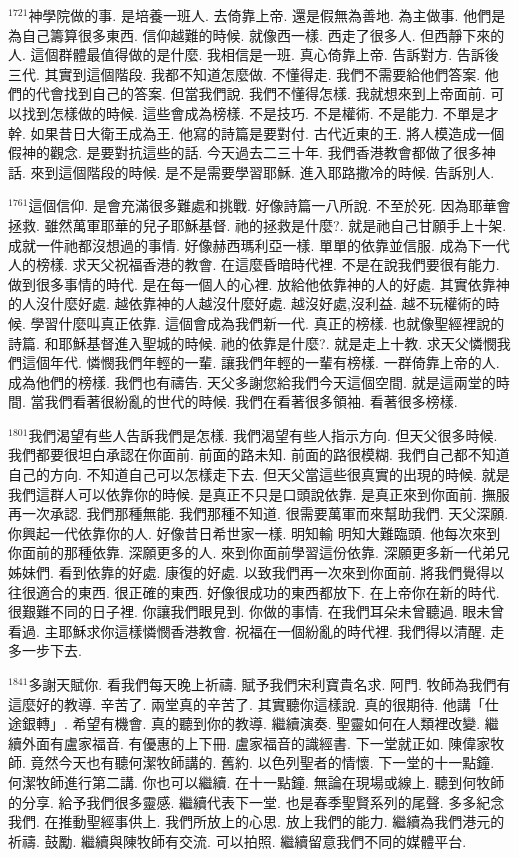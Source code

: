 \documentclass{book}
\begin{document}
$^{1721}$神學院做的事.
是培養一班人.
去倚靠上帝.
還是假無為善地.
為主做事.
他們是為自己籌算很多東西.
信仰越難的時候.
就像西一樣.
西走了很多人.
但西靜下來的人.
這個群體最值得做的是什麼.
我相信是一班.
真心倚靠上帝.
告訴對方.
告訴後三代.
其實到這個階段.
我都不知道怎麼做.
不懂得走.
我們不需要給他們答案.
他們的代會找到自己的答案.
但當我們說.
我們不懂得怎樣.
我就想來到上帝面前.
可以找到怎樣做的時候.
這些會成為榜樣.
不是技巧.
不是權術.
不是能力.
不單是才幹.
如果昔日大衛王成為王.
他寫的詩篇是要對付.
古代近東的王.
將人模造成一個假神的觀念.
是要對抗這些的話.
今天過去二三十年.
我們香港教會都做了很多神話.
來到這個階段的時候.
是不是需要學習耶穌.
進入耶路撒冷的時候.
告訴別人.

$^{1761}$這個信仰.
是會充滿很多難處和挑戰.
好像詩篇一八所說.
不至於死.
因為耶華會拯救.
雖然萬軍耶華的兒子耶穌基督.
祂的拯救是什麼?.
就是祂自己甘願手上十架.
成就一件祂都沒想過的事情.
好像赫西瑪利亞一樣.
單單的依靠並信服.
成為下一代人的榜樣.
求天父祝福香港的教會.
在這麼昏暗時代裡.
不是在說我們要很有能力.
做到很多事情的時代.
是在每一個人的心裡.
放給他依靠神的人的好處.
其實依靠神的人沒什麼好處.
越依靠神的人越沒什麼好處.
越沒好處,沒利益.
越不玩權術的時候.
學習什麼叫真正依靠.
這個會成為我們新一代.
真正的榜樣.
也就像聖經裡說的詩篇.
和耶穌基督進入聖城的時候.
祂的依靠是什麼?.
就是走上十教.
求天父憐憫我們這個年代.
憐憫我們年輕的一輩.
讓我們年輕的一輩有榜樣.
一群倚靠上帝的人.
成為他們的榜樣.
我們也有禱告.
天父多謝您給我們今天這個空間.
就是這兩堂的時間.
當我們看著很紛亂的世代的時候.
我們在看著很多領袖.
看著很多榜樣.

$^{1801}$我們渴望有些人告訴我們是怎樣.
我們渴望有些人指示方向.
但天父很多時候.
我們都要很坦白承認在你面前.
前面的路未知.
前面的路很模糊.
我們自己都不知道自己的方向.
不知道自己可以怎樣走下去.
但天父當這些很真實的出現的時候.
就是我們這群人可以依靠你的時候.
是真正不只是口頭說依靠.
是真正來到你面前.
撫服再一次承認.
我們那種無能.
我們那種不知道.
很需要萬軍而來幫助我們.
天父深願.
你興起一代依靠你的人.
好像昔日希世家一樣.
明知輸 明知大難臨頭.
他每次來到你面前的那種依靠.
深願更多的人.
來到你面前學習這份依靠.
深願更多新一代弟兄姊妹們.
看到依靠的好處.
康復的好處.
以致我們再一次來到你面前.
將我們覺得以往很適合的東西.
很正確的東西.
好像很成功的東西都放下.
在上帝你在新的時代.
很艱難不同的日子裡.
你讓我們眼見到.
你做的事情.
在我們耳朵未曾聽過.
眼未曾看過.
主耶穌求你這樣憐憫香港教會.
祝福在一個紛亂的時代裡.
我們得以清醒.
走多一步下去.

$^{1841}$多謝天賦你.
看我們每天晚上祈禱.
賦予我們宋利寶貴名求.
阿門.
 牧師為我們有這麼好的教導.
辛苦了.
兩堂真的辛苦了.
其實聽你這樣說.
真的很期待.
他講「仕途銀轉」.
希望有機會.
真的聽到你的教導.
繼續演奏.
聖靈如何在人類裡改變.
繼續外面有盧家福音.
有優惠的上下冊.
盧家福音的識經書.
下一堂就正如.
陳偉家牧師.
竟然今天也有聽何潔牧師講的.
舊約.
以色列聖者的情懷.
下一堂的十一點鐘.
何潔牧師進行第二講.
你也可以繼續.
在十一點鐘.
無論在現場或線上.
聽到何牧師的分享.
給予我們很多靈感.
繼續代表下一堂.
也是春季聖賢系列的尾聲.
多多紀念我們.
在推動聖經事供上.
我們所放上的心思.
放上我們的能力.
繼續為我們港元的祈禱.
鼓勵.
繼續與陳牧師有交流.
可以拍照.
繼續留意我們不同的媒體平台.
\end{document}
